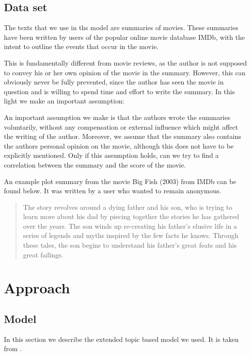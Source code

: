 \documentclass[a4paper,10pt]{article}
\begin{document}
\subsection{Data set}
The texts that we use in ths model are summaries of movies.
These summaries have been written by users of the popular online movie database IMDb, with the intent to outline the events that occur in the movie.

This is fundamentally different from movie reviews, as the author is not supposed to convey his or her own opinion of the movie in the summary.
However, this can obviously never be fully prevented, since the author has seen the movie in question and is willing to spend time and effort to write the summary.
In this light we make an important assumption:

An important assumption we make is that the authors wrote the summaries voluntarily, without any compensation or external influence which might affect the writing of the author.
Moreover, we assume that the summary also contains the authors personal opinion on the movie, although this does not have to be explicitly mentioned.
Only if this assumption holds, can we try to find a correlation between the summary and the score of the movie.

An example plot summary from the movie Big Fish (2003) from IMDb can be found below. 
It was written by a user who wanted to remain anonymous.
\begin{quotation}
  The story revolves around a dying father and his son, who is trying to learn more about his dad by piecing together the stories he has gathered over the years. The son winds up re-creating his father's elusive life in a series of legends and myths inspired by the few facts he knows. Through these tales, the son begins to understand his father's great feats and his great failings.
\end{quotation}

\section{Approach}

\subsection{Model}
In this section we describe the extended topic based model we used.
It is taken from \cite{dfsdf}.
\end{document}

